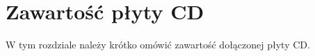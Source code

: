 \chapter{Zawartość płyty CD}
\thispagestyle{chapterBeginStyle}
\label{plytaCD}

{\color{dgray}
W tym rozdziale należy krótko omówić zawartość dołączonej płyty CD.
}

